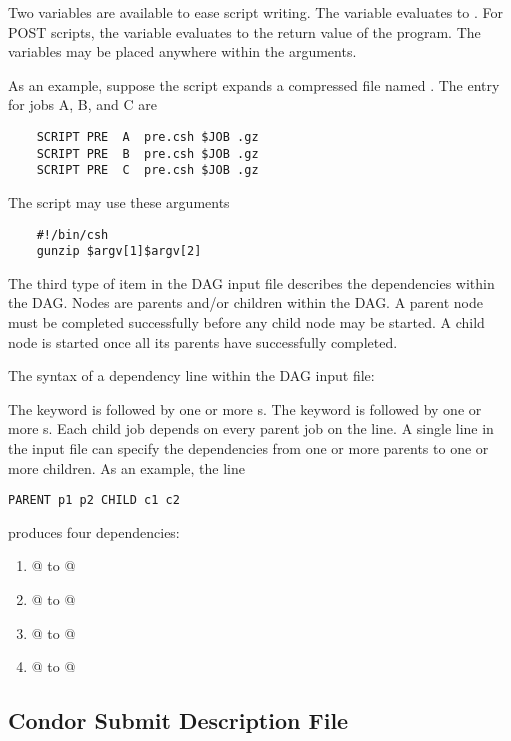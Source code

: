 Two variables are available to ease script writing.
The  variable evaluates to .
For POST scripts, the  variable evaluates to the return value of the program.
The variables may be
placed anywhere within the arguments.

As an example, suppose the  script expands a compressed file named
.
The  entry for jobs A, B, and C are

\begin{verbatim}
	SCRIPT PRE  A  pre.csh $JOB .gz
	SCRIPT PRE  B  pre.csh $JOB .gz
	SCRIPT PRE  C  pre.csh $JOB .gz
\end{verbatim}

The script  may use these arguments

\begin{verbatim}
	#!/bin/csh
	gunzip $argv[1]$argv[2]
\end{verbatim}


The third type of item in the DAG input file describes the
dependencies within the DAG.
Nodes are parents and/or children within the DAG.
A parent node must be completed successfully before
any child node may be started.
A child node is started once
all its parents have successfully completed.

The syntax of a dependency line within the DAG input file:

   

The  keyword is followed by one or more
s.
The  keyword is followed by one or more
s.
Each child job depends on every parent job on the line.
A single line in the input file can specify the dependencies from one or more
parents to one or more children.
As an example, the line
\begin{verbatim}
PARENT p1 p2 CHILD c1 c2
\end{verbatim}
produces four dependencies:
\begin{enumerate}
\item{@ to @}
\item{@ to @}
\item{@ to @}
\item{@ to @}
\end{enumerate}

\subsection{Condor Submit Description File}

